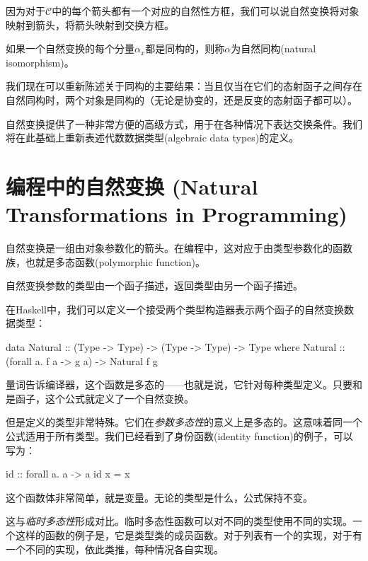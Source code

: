 \documentclass[DaoFP]{subfiles}
\begin{document}
    因为对于$\mathcal{C}$中的每个箭头都有一个对应的自然性方框，我们可以说自然变换将对象映射到箭头，将箭头映射到交换方框。

    如果一个自然变换的每个分量$\alpha_x$都是同构的，则称$\alpha$为自然同构(natural isomorphism)。

    我们现在可以重新陈述关于同构的主要结果：当且仅当在它们的态射函子之间存在自然同构时，两个对象是同构的（无论是协变的，还是反变的态射函子都可以）。

    自然变换提供了一种非常方便的高级方式，用于在各种情况下表达交换条件。我们将在此基础上重新表述代数数据类型(algebraic data types)的定义。

    \section{编程中的自然变换 (Natural Transformations in Programming)}

    自然变换是一组由对象参数化的箭头。在编程中，这对应于由类型参数化的函数族，也就是多态函数(polymorphic function)。

    自然变换参数的类型由一个函子描述，返回类型由另一个函子描述。

    在Haskell中，我们可以定义一个接受两个类型构造器表示两个函子的自然变换数据类型：

    \begin{haskell}
        data Natural :: (Type -> Type) -> (Type -> Type) -> Type where
        Natural :: (forall a. f a -> g a) -> Natural f g
    \end{haskell}
    量词告诉编译器，这个函数是多态的——也就是说，它针对每种类型定义。只要和是函子，这个公式就定义了一个自然变换。

    但是定义的类型非常特殊。它们在\emph{参数多态性}的意义上是多态的。这意味着同一个公式适用于所有类型。我们已经看到了身份函数(identity function)的例子，可以写为：
    \begin{haskell}
        id :: forall a. a -> a
        id x = x
    \end{haskell}
    这个函数体非常简单，就是变量。无论的类型是什么，公式保持不变。

    这与\emph{临时多态性}形成对比。临时多态性函数可以对不同的类型使用不同的实现。一个这样的函数的例子是，它是类型类的成员函数。对于列表有一个的实现，对于有一个不同的实现，依此类推，每种情况各自实现。
\end{document}
